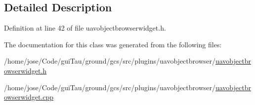 \subsection{Detailed Description}


Definition at line 42 of file uavobjectbrowserwidget.\-h.



The documentation for this class was generated from the following files\-:\begin{DoxyCompactItemize}
\item 
/home/jose/\-Code/gui\-Tau/ground/gcs/src/plugins/uavobjectbrowser/\hyperlink{uavobjectbrowserwidget_8h}{uavobjectbrowserwidget.\-h}\item 
/home/jose/\-Code/gui\-Tau/ground/gcs/src/plugins/uavobjectbrowser/\hyperlink{uavobjectbrowserwidget_8cpp}{uavobjectbrowserwidget.\-cpp}\end{DoxyCompactItemize}
